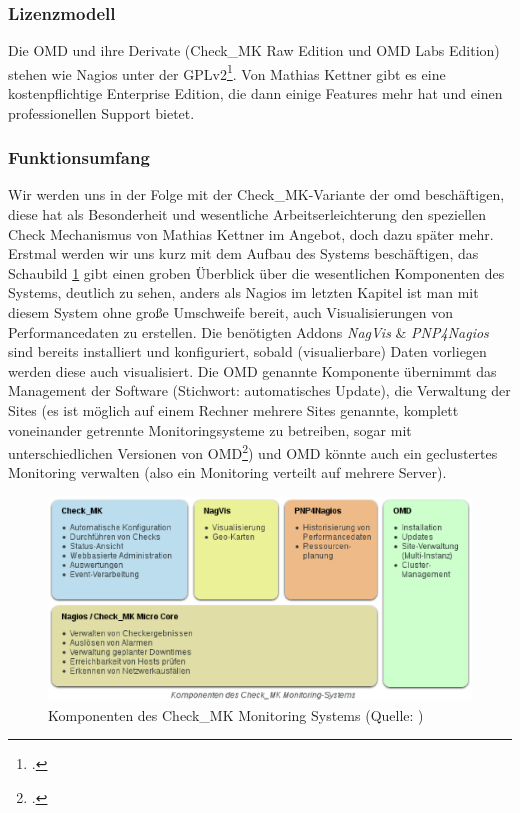\documentclass[12pt,a4paper,parskip,listof=totoc,bibliography=totoc]{scrreprt}
\begin{document}
	\subsubsection{Lizenzmodell}
	Die OMD und ihre Derivate (Check\_MK Raw Edition und OMD Labs Edition) stehen wie Nagios unter der GPLv2\footcite{checkmkcre}. Von Mathias Kettner gibt es eine kostenpflichtige Enterprise Edition, die dann einige Features mehr hat und einen professionellen Support bietet.
	\subsubsection{Funktionsumfang}
	Wir werden uns in der Folge mit der Check\_MK-Variante der \acrshort{omd} beschäftigen, diese hat als Besonderheit und wesentliche Arbeitserleichterung den speziellen Check Mechanismus von Mathias Kettner im Angebot, doch dazu später mehr. Erstmal werden wir uns kurz mit dem Aufbau des Systems beschäftigen, das Schaubild \ref{fig:checkmk} gibt einen groben Überblick über die wesentlichen Komponenten des Systems, deutlich zu sehen, anders als Nagios im letzten Kapitel ist man mit diesem System ohne große Umschweife bereit, auch Visualisierungen von Performancedaten zu erstellen. Die benötigten Addons \textit{NagVis} \& \textit{PNP4Nagios} sind bereits installiert und konfiguriert, sobald (visualierbare) Daten vorliegen werden diese auch visualisiert. Die OMD genannte Komponente übernimmt das Management der Software (Stichwort: automatisches Update), die Verwaltung der Sites (es ist möglich auf einem Rechner mehrere Sites genannte, komplett voneinander getrennte Monitoringsysteme zu betreiben, sogar mit unterschiedlichen Versionen von OMD\footcite{omdhomepage}) und OMD könnte auch ein geclustertes Monitoring verwalten (also ein Monitoring verteilt auf mehrere Server).
	\begin{figure}
		\centering
		\includegraphics[width=1\textwidth]{pics/checkMKAufbau.eps}
		\caption[Komponenten des Check\_MK Monitoring Systems]{Komponenten des Check\_MK Monitoring Systems (Quelle: \cite{checkmkmonitoringpic})}
		\label{fig:checkmk}
	\end{figure}
\end{document}
